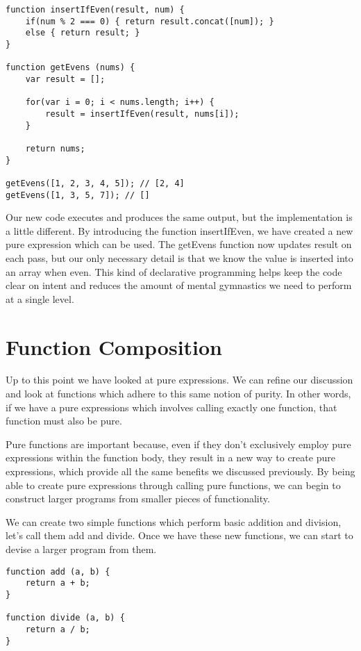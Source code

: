 \documentclass[a4paper,12pt,twoside]{book}
\begin{document}
\begin{lstlisting}
function insertIfEven(result, num) {
    if(num % 2 === 0) { return result.concat([num]); }
    else { return result; }
}

function getEvens (nums) {
    var result = [];
    
    for(var i = 0; i < nums.length; i++) {
        result = insertIfEven(result, nums[i]);    
    }
    
    return nums;
}

getEvens([1, 2, 3, 4, 5]); // [2, 4]
getEvens([1, 3, 5, 7]); // []
\end{lstlisting}

 Our new code executes and produces the same output, but the implementation is a little different. By introducing the function insertIfEven, we have created a new pure expression which can be used. The getEvens function now updates result on each pass, but our only necessary detail is that we know the value is inserted into an array when even. This kind of declarative programming helps keep the code clear on intent and reduces the amount of mental gymnastics we need to perform at a single level.

\section{Function Composition}

 Up to this point we have looked at pure expressions. We can refine our discussion and look at functions which adhere to this same notion of purity. In other words, if we have a pure expressions which involves calling exactly one function, that function must also be pure.
 
 Pure functions are important because, even if they don't exclusively employ pure expressions within the function body, they result in a new way to create pure expressions, which provide all the same benefits we discussed previously.  By being able to create pure expressions through calling pure functions, we can begin to construct larger programs from smaller pieces of functionality.
 
 We can create two simple functions which perform basic addition and division, let's call them add and divide. Once we have these new functions, we can start to devise a larger program from them.
 
\begin{lstlisting}
function add (a, b) {
    return a + b;
}

function divide (a, b) {
    return a / b;
}
\end{lstlisting}
\end{document}
